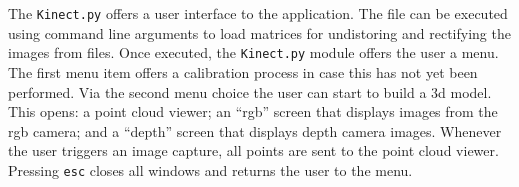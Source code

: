 
The \texttt{Kinect.py} offers a user interface to the application. The file can
be executed using command line arguments to load matrices for undistoring and
rectifying the images from files. Once executed, the \texttt{Kinect.py} module
offers the user a menu. The first menu item offers a calibration process in case
this has not yet been performed.  Via the second menu choice the user can start
to build a 3d model. This opens: a point cloud viewer; an ``rgb'' screen that
displays images from the rgb camera; and a ``depth'' screen that displays depth
camera images. Whenever the user triggers an image capture, all points are sent
to the point cloud viewer. Pressing \texttt{esc} closes all windows and returns
the user to the menu.
